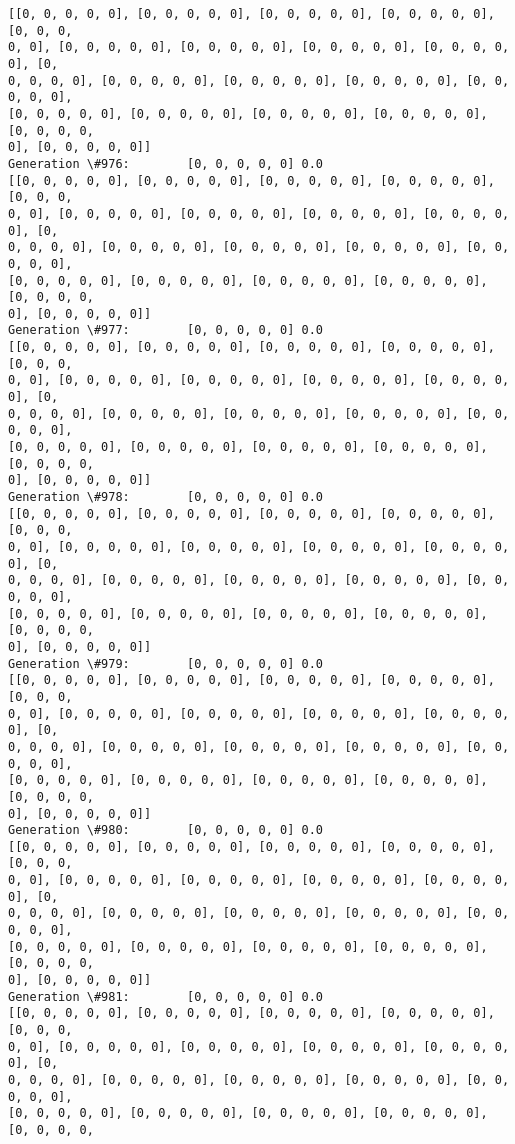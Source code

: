 \documentclass[11pt]{article}
\begin{document}
\begin{Verbatim}[commandchars=\\\{\}]
[[0, 0, 0, 0, 0], [0, 0, 0, 0, 0], [0, 0, 0, 0, 0], [0, 0, 0, 0, 0], [0, 0, 0,
0, 0], [0, 0, 0, 0, 0], [0, 0, 0, 0, 0], [0, 0, 0, 0, 0], [0, 0, 0, 0, 0], [0,
0, 0, 0, 0], [0, 0, 0, 0, 0], [0, 0, 0, 0, 0], [0, 0, 0, 0, 0], [0, 0, 0, 0, 0],
[0, 0, 0, 0, 0], [0, 0, 0, 0, 0], [0, 0, 0, 0, 0], [0, 0, 0, 0, 0], [0, 0, 0, 0,
0], [0, 0, 0, 0, 0]]
Generation \#976:        [0, 0, 0, 0, 0] 0.0
[[0, 0, 0, 0, 0], [0, 0, 0, 0, 0], [0, 0, 0, 0, 0], [0, 0, 0, 0, 0], [0, 0, 0,
0, 0], [0, 0, 0, 0, 0], [0, 0, 0, 0, 0], [0, 0, 0, 0, 0], [0, 0, 0, 0, 0], [0,
0, 0, 0, 0], [0, 0, 0, 0, 0], [0, 0, 0, 0, 0], [0, 0, 0, 0, 0], [0, 0, 0, 0, 0],
[0, 0, 0, 0, 0], [0, 0, 0, 0, 0], [0, 0, 0, 0, 0], [0, 0, 0, 0, 0], [0, 0, 0, 0,
0], [0, 0, 0, 0, 0]]
Generation \#977:        [0, 0, 0, 0, 0] 0.0
[[0, 0, 0, 0, 0], [0, 0, 0, 0, 0], [0, 0, 0, 0, 0], [0, 0, 0, 0, 0], [0, 0, 0,
0, 0], [0, 0, 0, 0, 0], [0, 0, 0, 0, 0], [0, 0, 0, 0, 0], [0, 0, 0, 0, 0], [0,
0, 0, 0, 0], [0, 0, 0, 0, 0], [0, 0, 0, 0, 0], [0, 0, 0, 0, 0], [0, 0, 0, 0, 0],
[0, 0, 0, 0, 0], [0, 0, 0, 0, 0], [0, 0, 0, 0, 0], [0, 0, 0, 0, 0], [0, 0, 0, 0,
0], [0, 0, 0, 0, 0]]
Generation \#978:        [0, 0, 0, 0, 0] 0.0
[[0, 0, 0, 0, 0], [0, 0, 0, 0, 0], [0, 0, 0, 0, 0], [0, 0, 0, 0, 0], [0, 0, 0,
0, 0], [0, 0, 0, 0, 0], [0, 0, 0, 0, 0], [0, 0, 0, 0, 0], [0, 0, 0, 0, 0], [0,
0, 0, 0, 0], [0, 0, 0, 0, 0], [0, 0, 0, 0, 0], [0, 0, 0, 0, 0], [0, 0, 0, 0, 0],
[0, 0, 0, 0, 0], [0, 0, 0, 0, 0], [0, 0, 0, 0, 0], [0, 0, 0, 0, 0], [0, 0, 0, 0,
0], [0, 0, 0, 0, 0]]
Generation \#979:        [0, 0, 0, 0, 0] 0.0
[[0, 0, 0, 0, 0], [0, 0, 0, 0, 0], [0, 0, 0, 0, 0], [0, 0, 0, 0, 0], [0, 0, 0,
0, 0], [0, 0, 0, 0, 0], [0, 0, 0, 0, 0], [0, 0, 0, 0, 0], [0, 0, 0, 0, 0], [0,
0, 0, 0, 0], [0, 0, 0, 0, 0], [0, 0, 0, 0, 0], [0, 0, 0, 0, 0], [0, 0, 0, 0, 0],
[0, 0, 0, 0, 0], [0, 0, 0, 0, 0], [0, 0, 0, 0, 0], [0, 0, 0, 0, 0], [0, 0, 0, 0,
0], [0, 0, 0, 0, 0]]
Generation \#980:        [0, 0, 0, 0, 0] 0.0
[[0, 0, 0, 0, 0], [0, 0, 0, 0, 0], [0, 0, 0, 0, 0], [0, 0, 0, 0, 0], [0, 0, 0,
0, 0], [0, 0, 0, 0, 0], [0, 0, 0, 0, 0], [0, 0, 0, 0, 0], [0, 0, 0, 0, 0], [0,
0, 0, 0, 0], [0, 0, 0, 0, 0], [0, 0, 0, 0, 0], [0, 0, 0, 0, 0], [0, 0, 0, 0, 0],
[0, 0, 0, 0, 0], [0, 0, 0, 0, 0], [0, 0, 0, 0, 0], [0, 0, 0, 0, 0], [0, 0, 0, 0,
0], [0, 0, 0, 0, 0]]
Generation \#981:        [0, 0, 0, 0, 0] 0.0
[[0, 0, 0, 0, 0], [0, 0, 0, 0, 0], [0, 0, 0, 0, 0], [0, 0, 0, 0, 0], [0, 0, 0,
0, 0], [0, 0, 0, 0, 0], [0, 0, 0, 0, 0], [0, 0, 0, 0, 0], [0, 0, 0, 0, 0], [0,
0, 0, 0, 0], [0, 0, 0, 0, 0], [0, 0, 0, 0, 0], [0, 0, 0, 0, 0], [0, 0, 0, 0, 0],
[0, 0, 0, 0, 0], [0, 0, 0, 0, 0], [0, 0, 0, 0, 0], [0, 0, 0, 0, 0], [0, 0, 0, 0,

\end{Verbatim}
\end{document}
